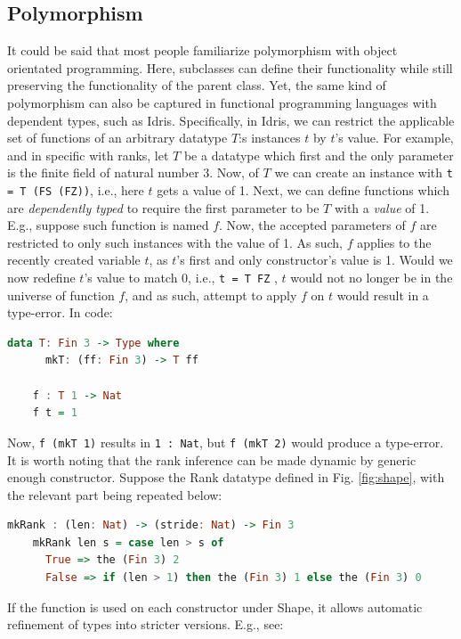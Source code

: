 \documentclass{report}
\begin{document}
\subsection{Polymorphism}
\label{section:polymorphism}

It could be said that most people familiarize polymorphism with object orientated programming. Here, subclasses can define their functionality while still preserving the functionality of the parent class. Yet, the same kind of polymorphism can also be captured in functional programming languages with dependent types, such as Idris. Specifically, in Idris, we can restrict the applicable set of functions of an arbitrary datatype $T$:s instances $t$ by $t$'s value. For example, and in specific with ranks, let $T$ be a datatype which first and the only parameter is the finite field of natural number 3. Now, of $T$ we can create an instance with \verb|t = T (FS (FZ))|, i.e., here $t$ gets a value of 1. Next, we can define functions which are \emph{dependently typed} to require the first parameter to be $T$ with a \emph{value} of 1. E.g., suppose such function is named $f$. Now, the accepted parameters of $f$ are restricted to only such instances with the value of 1. As such, $f$ applies to the recently created variable $t$, as $t$'s first and only constructor's value is 1. Would we now redefine $t$'s value to match 0, i.e., \verb|t = T FZ| , $t$ would not no longer be in the universe of function $f$, and as such, attempt to apply $f$ on $t$ would result in a type-error. In code:

\begin{lstlisting}[language=Haskell]
    data T: Fin 3 -> Type where
      mkT: (ff: Fin 3) -> T ff
    
    f : T 1 -> Nat
    f t = 1
\end{lstlisting}

Now, \verb|f (mkT 1)| results in \verb|1 : Nat|, but \verb|f (mkT 2)| would produce a type-error. It is worth noting that the rank inference can be made dynamic by generic enough constructor. Suppose the Rank datatype defined in Fig. \ref{fig:shape}, with the relevant part being repeated below:

\begin{lstlisting}[language=Haskell]
    mkRank : (len: Nat) -> (stride: Nat) -> Fin 3
    mkRank len s = case len > s of
      True => the (Fin 3) 2
      False => if (len > 1) then the (Fin 3) 1 else the (Fin 3) 0
\end{lstlisting}

If the function is used on each constructor under Shape, it allows automatic refinement of types into stricter versions. E.g., see:
\end{document}
